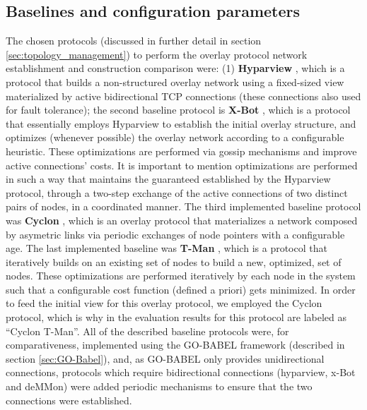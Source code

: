 \subsection{Baselines and configuration parameters}

The chosen protocols (discussed in further detail in section \ref{sec:topology_management}) to perform the overlay protocol network establishment and construction comparison were: (1) \textbf{Hyparview} , which is a protocol that builds a non-structured overlay network using a fixed-sized view materialized by active bidirectional TCP connections (these connections also used for fault tolerance); the second baseline protocol is \textbf{X-Bot} , which is a protocol that essentially employs Hyparview to establish the initial overlay structure, and optimizes (whenever possible) the overlay network according to a configurable heuristic. These optimizations are performed via gossip mechanisms and improve active connections' costs. It is important to mention optimizations are performed in such a way that maintains the guaranteed established by the Hyparview protocol, through a two-step exchange of the active connections of two distinct pairs of nodes, in a coordinated manner. The third implemented baseline protocol was \textbf{Cyclon} , which is an overlay protocol that materializes a network composed by asymetric links via periodic exchanges of node pointers with a configurable age. The last implemented baseline was \textbf{T-Man} , which is a protocol that iteratively builds on an existing set of nodes to build a new, optimized, set of nodes. These optimizations are performed iteratively by each node in the system such that a configurable cost function  (defined a priori) gets minimized. In order to feed the initial view for this overlay protocol, we employed the Cyclon protocol, which is why in the evaluation results for this protocol are labeled as ``Cyclon T-Man''. All of the described baseline protocols were, for comparativeness, implemented using the GO-BABEL framework (described in section \ref{sec:GO-Babel}), and, as GO-BABEL only provides unidirectional connections, protocols which require bidirectional connections (hyparview, x-Bot and deMMon) were added periodic mechanisms to ensure that the two connections were established.


